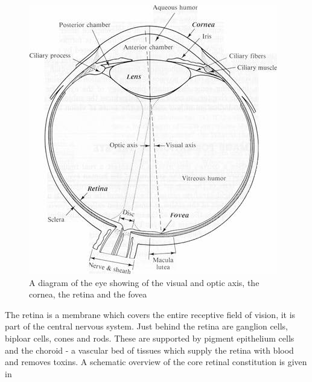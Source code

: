 \begin{figure}[htbp]
 \centering
   \includegraphics{figures/eye_diagram}
 \caption{A diagram of the eye showing of the visual
  and optic axis, the cornea, the retina and the fovea}
 \label{fig:optic_axis}
\end{figure}

The retina is a membrane which covers the entire receptive field of
vision, it is part of the central nervous system.\cite{rogers1983neurite}
Just behind the retina are ganglion cells, biploar cells, cones and rods.
These are supported by pigment epithelium cells and the choroid - a vascular
bed of tissues which supply the retina with blood and removes toxins.
\cite{lutty1996localization} A schematic overview of the core retinal
constitution is given in 


